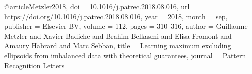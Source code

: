 @article{Metzler2018,
  doi = {10.1016/j.patrec.2018.08.016},
  url = {https://doi.org/10.1016/j.patrec.2018.08.016},
  year  = {2018},
  month = {sep},
  publisher = {Elsevier {BV}},
  volume = {112},
  pages = {310--316},
  author = {Guillaume Metzler and Xavier Badiche and Brahim Belkasmi and Elisa Fromont and Amaury Habrard and Marc Sebban},
  title = {Learning maximum excluding ellipsoids from imbalanced data with theoretical guarantees},
  journal = {Pattern Recognition Letters}
}
